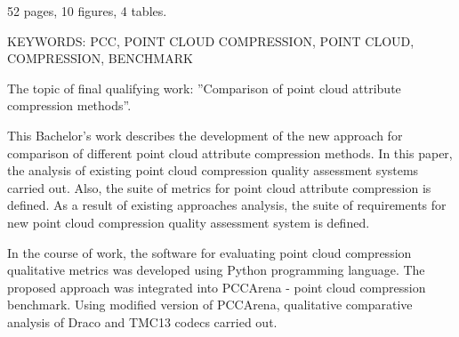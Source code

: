 52 pages, 10 figures, 4 tables.

KEYWORDS: PCC, POINT CLOUD COMPRESSION, POINT CLOUD, COMPRESSION, BENCHMARK

The topic of final qualifying work: ''Comparison of point cloud attribute
compression methods''.

This Bachelor's work describes the development of the new approach for
comparison of different point cloud attribute compression methods. In this
paper, the analysis of existing point cloud compression quality assessment
systems carried out. Also, the suite of metrics for point cloud attribute
compression is defined. As a result of existing approaches analysis, the suite
of requirements for new point cloud compression quality assessment system is
defined.

In the course of work, the software for evaluating point cloud compression
qualitative metrics was developed using Python programming language. The
proposed approach was integrated into PCCArena - point cloud compression
benchmark. Using modified version of PCCArena, qualitative comparative analysis
of Draco and TMC13 codecs carried out.